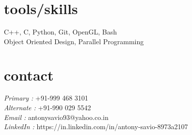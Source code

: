 \documentclass[margin]{res}
\begin{document}
\begin{resume}
        
		
\section{tools/skills}  C++, C, Python, Git, OpenGL, Bash\\
                        Object Oriented Design, Parallel Programming
            
\section{contact}
	   {\sl Primary :}
	   +91-999 468 3101 \\
	   {\sl Alternate :}
	   +91-990 029 5542 \\
	   {\sl Email :}
	   antonysavio93@yahoo.co.in \\
	   {\sl LinkedIn :}
	   https://in.linkedin.com/in/antony-savio-8973a2107 \\ 

\end{resume}
\end{document}

